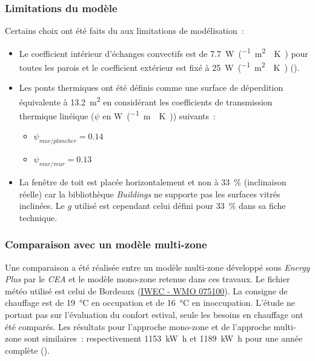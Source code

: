 \subsubsection{Limitations du modèle} %
\label{ssub:limitations_du_modele}
Certains choix ont été faits du aux limitations de modélisation~:
\begin{itemize}
    \item Le coefficient intérieur d’échanges convectifs est de \SI{7.7}{\watt\per(\meter\squared\period\kelvin)}
          pour toutes les parois et le coefficient extérieur
          est fixé à \SI{25}{\watt\per(\meter\squared\period\kelvin)} (\textcite{NFENISO6946}).
    \item Les ponts thermiques ont été définis comme une surface de déperdition
          équivalente à \SI{13.2}{\meter\squared} en considérant les coefficients de transmission
          thermique linéique ($\psi$ en \si{\watt\per(\metre\period\kelvin)}) suivants~:
          \begin{itemize}
              \item $\psi_{mur / plancher} = \num{0.14}$
              \item $\psi_{mur / mur} = \num{0.13}$
          \end{itemize}
    \item La fenêtre de toit est placée horizontalement et non à \SI{33}{\percent}
          (inclinaison réelle) car la bibliothèque \textit{Buildings} ne supporte pas les
          surfaces vitrés inclinées. Le $g$ utilisé est cependant celui défini
          pour \SI{33}{\percent} dans sa fiche technique.
\end{itemize}


\subsubsection{Comparaison avec un modèle multi-zone} %
\label{ssub:comparaison_avec_un_modele_multi_zone}
Une comparaison a été réalisée entre un modèle multi-zone développé sous \textit{Energy Plus}
par le \textit{CEA} et le modèle mono-zone retenue dans ces travaux. Le fichier météo
utilisé est celui de Bordeaux
(\href{https://www.energyplus.net/weather-download/europe_wmo_region_6/FRA//FRA_Bordeaux.075100_IWEC/all}{IWEC - WMO 075100}).
La consigne de chauffage est de \SI{19}{\celsius} en occupation et de \SI{16}{\celsius} en
inoccupation. L’étude ne portant pas sur l’évaluation du confort estival, seule les
besoins en chauffage ont été comparés. Les résultats pour l’approche mono-zone et de l’approche
multi-zone sont similaires~: respectivement \SI{1153}{\kilo\watt\hour} et
\SI{1189}{\kilo\watt\hour} pour une année complète ().

